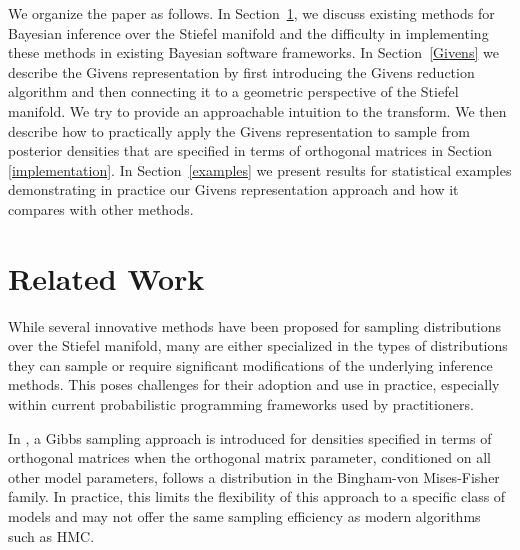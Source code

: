 \documentclass[ba]{imsart}
\numberwithin{equation}{section}
\theoremstyle{plain}
\begin{document}
\noindent We organize the paper as follows. In Section~\ref{related}, we discuss existing methods for Bayesian inference over the Stiefel manifold and the difficulty in implementing these methods in existing Bayesian software frameworks. In Section~\ref{Givens} we describe the Givens representation by first introducing the Givens reduction algorithm and then connecting it to a geometric perspective of the Stiefel manifold. We try to provide an approachable intuition to the transform. We then describe how to practically apply the Givens representation to sample from posterior densities that are specified in terms of orthogonal matrices in Section \ref{implementation}. In Section~\ref{examples} we present results for statistical examples demonstrating in practice our Givens representation approach and how it compares with other methods.  

\section{Related Work} \label{related}
While several innovative methods have been proposed for sampling distributions over the Stiefel manifold, many are either specialized in the types of distributions they can sample or require significant modifications of the underlying inference methods. This poses challenges for their adoption and use in practice, especially within current probabilistic programming frameworks used by practitioners.

\noindent In \cite{hoff2009simulation}, a Gibbs sampling approach is introduced for densities specified in terms of orthogonal matrices when the orthogonal matrix parameter, conditioned on all other model parameters, follows a distribution in the Bingham-von Mises-Fisher family. In practice, this limits the flexibility of this approach to a specific class of models and may not offer the same sampling efficiency as modern algorithms such as HMC. 
\end{document}
